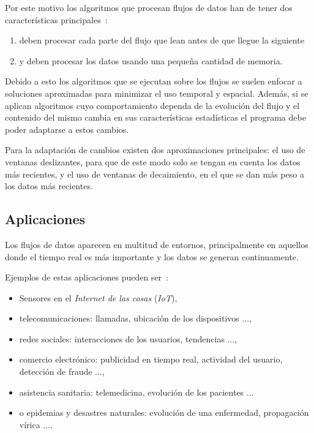Por este motivo los algoritmos que procesan flujos de datos han de tener dos características principales~\cite{bifet2018machine}:

\begin{enumerate}
	\item deben procesar cada parte del flujo que lean antes de que llegue la siguiente
	\item y deben procesar los datos usando una pequeña cantidad de memoria.
\end{enumerate}

Debido a esto los algoritmos que se ejecutan sobre los flujos se suelen enfocar a soluciones aproximadas para minimizar el uso temporal y espacial. Además, si se aplican algoritmos cuyo comportamiento dependa de la evolución del flujo y el contenido del mismo cambia en sus características estadísticas el programa debe poder adaptarse a estos cambios.

Para la adaptación de cambios existen dos aproximaciones principales: el uso de ventanas deslizantes, para que de este modo solo se tengan en cuenta los datos más recientes, y el uso de ventanas de decaimiento, en el que se dan más peso a los datos más recientes. 

\subsection{Aplicaciones}

Los flujos de datos aparecen en multitud de entornos, principalmente en aquellos donde el tiempo real es más importante y los datos se generan continuamente.

Ejemplos de estas aplicaciones pueden ser~\cite{rodriguez2020flujos}:
\begin{itemize}
	\item Sensores en el \textit{Internet de las cosas} (\textit{IoT}),
	\item telecomunicaciones: llamadas, ubicación de los dispositivos $\ldots$,
	\item redes sociales: interacciones de los usuarios, tendencias $\ldots$,
	\item comercio electrónico: publicidad en tiempo real, actividad del usuario, detección de fraude $\ldots$,
	\item asistencia sanitaria: telemedicina, evolución de los pacientes $\ldots$
	\item o epidemias y desastres naturales: evolución de una enfermedad, propagación vírica $\ldots$.
\end{itemize}




